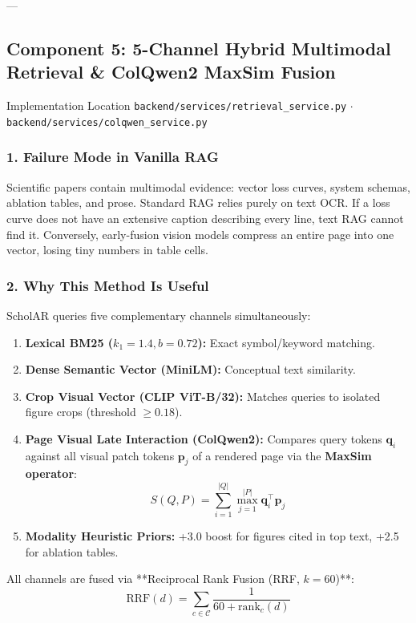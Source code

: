\documentclass[11pt,a4paper]{article}
\begin{document}
---

\subsection{Component 5: 5-Channel Hybrid Multimodal Retrieval \& ColQwen2 MaxSim Fusion}
\begin{codebox}{Implementation Location}
\texttt{backend/services/retrieval\_service.py} $\cdot$ \texttt{backend/services/colqwen\_service.py}
\end{codebox}

\subsubsection{1. Failure Mode in Vanilla RAG}
Scientific papers contain multimodal evidence: vector loss curves, system schemas, ablation tables, and prose. Standard RAG relies purely on text OCR. If a loss curve does not have an extensive caption describing every line, text RAG cannot find it. Conversely, early-fusion vision models compress an entire page into one vector, losing tiny numbers in table cells.

\subsubsection{2. Why This Method Is Useful}
ScholAR queries five complementary channels simultaneously:
\begin{enumerate}[leftmargin=*]
    \item \textbf{Lexical BM25 ($k_1=1.4, b=0.72$):} Exact symbol/keyword matching.
    \item \textbf{Dense Semantic Vector (MiniLM):} Conceptual text similarity.
    \item \textbf{Crop Visual Vector (CLIP ViT-B/32):} Matches queries to isolated figure crops (threshold $\ge 0.18$).
    \item \textbf{Page Visual Late Interaction (ColQwen2):} Compares query tokens $\mathbf{q}_i$ against all visual patch tokens $\mathbf{p}_j$ of a rendered page via the \textbf{MaxSim operator}:
    \begin{equation}
        S(Q, P) = \sum_{i=1}^{|Q|} \max_{j=1}^{|P|} \mathbf{q}_i^\top \mathbf{p}_j
    \end{equation}
    \item \textbf{Modality Heuristic Priors:} +3.0 boost for figures cited in top text, +2.5 for ablation tables.
\end{enumerate}
All channels are fused via **Reciprocal Rank Fusion (RRF, $k=60$)**:
\begin{equation}
    \text{RRF}(d) = \sum_{c \in \mathcal{C}} \frac{1}{60 + \text{rank}_c(d)}
\end{equation}
\end{document}
